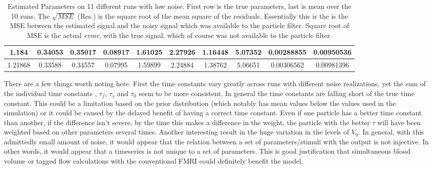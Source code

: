 \begin{table}[t]
\begin{tabular}{|c | c | c | c | c | c | c | c | c | c |}
1.184 & 0.34053 & 0.35017 & 0.08917 & 1.61025 & 2.27926 & 1.16448 & 5.07352   &  0.00288855  & 0.00950536  \\
\hline                                                                           
1.21868 & 0.33588 & 0.34557 & 0.07995 & 1.59899 & 2.24884 & 1.38762 & 5.06651 & 0.00306562     & 0.00981396 \\
\hline 
\end{tabular}
\caption{Estimated Parameters on 11 different runs with low noise. First row is the true parameters,
last is mean over the 10 runs. The $\sqrt{MSE}$ (Res.) is the square root of the mean square of the
residuals. Essentially this is the is the MSE between the estimated signal and the noisy signal which 
was available to the particle filter. Square root of MSE is the actual \emph{error}, with the true signal,
which of course was not available to the particle filter.}
\label{tab:LowNoiseResults} 
\end{table}

There are a few things worth noting here. First the time constants vary greatly across
runs with different noise realizations, yet the sum of the individual time constants
, $\tau_f$, $\tau_s$ and $\tau_0$ seem to be more consistent. In general the 
time constants are falling short of the true time constant. This could be a limitation
based on the prior distribution (which notably has mean values below the values used
in the simulation) or it could be caused by the delayed benefit of having a 
correct time constant. Even if one particle has a better time constant than another, if
the difference isn't severe, by the time this makes a difference in the weight, the 
particle with the better $\tau$ will have been weighted based on other parameters several
times. Another interesting result in the huge variation in the levels of $V_0$. In general,
with this admittedly small amount of noise, it would appear that the relation between a set
of parameters/stimuli with the output is not injective. In other words, it would appear
that a timeseries is not unique to a set of parameters. This is good justification that 
simultaneous blood volume or tagged flow calculations with the conventional FMRI 
could definitely benefit the model. 

